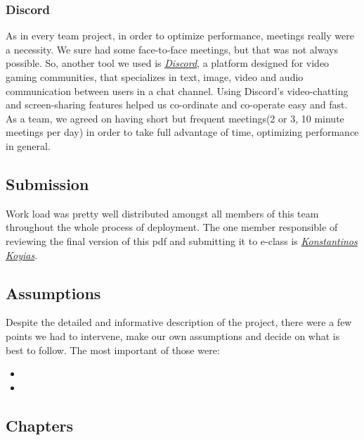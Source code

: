 \documentclass{article}
\begin{document}
\subsubsection{Discord}
As in every team project, in order to optimize performance, meetings really were a necessity. We sure had some face-to-face meetings, but that was not always possible. So, another tool we used is \href{https://discordapp.com/}{\underline{\emph{Discord}}}, a platform designed for video gaming communities, that specializes in text, image, video and audio communication between users in a chat channel. Using Discord's video-chatting and screen-sharing features helped us co-ordinate and co-operate easy and fast. As a team, we agreed on having short but frequent meetings(2 or 3, 10 minute meetings per day) in order to take full advantage of time, optimizing performance in general.

\subsection{Submission}
Work load was pretty well distributed amongst all members of this team throughout the whole process of deployment. The one member responsible of reviewing the final version of this pdf and submitting it to e-class is
\href{https://github.com/KostasKoyias}{\emph{Konstantinos Koyias}}.  

\subsection{Assumptions}
Despite the detailed and informative description of the project, there were a few points we had to intervene, make our own assumptions and decide on what is best to follow. The most important of those were:
\begin{itemize}
\item 
\item
\end{itemize} 

\subsection{Chapters} 
\end{document}
